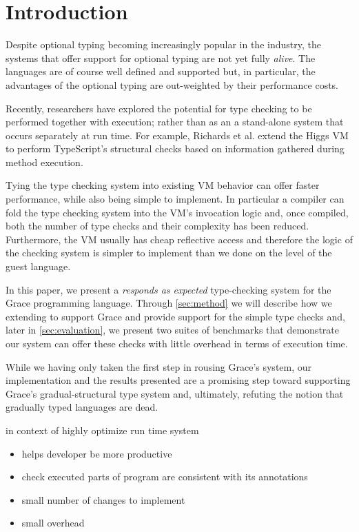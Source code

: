 
\section{Introduction}
\label{sec:introduction}

Despite optional typing becoming increasingly popular in the industry, the systems that offer support for optional typing are not yet fully \emph{alive}. The languages are of course well defined and supported but, in particular, the advantages of the optional typing are out-weighted by their performance costs. 

Recently, researchers have explored the potential for type checking to be performed together with execution; rather than as an a stand-alone system that occurs separately at run time. For example, Richards et al. extend the Higgs VM to perform TypeScript's structural checks based on information gathered during method execution. 

Tying the type checking system into existing VM behavior can offer faster performance, while also being simple to implement. In particular a compiler can fold the type checking system into the VM's invocation logic and, once compiled, both the number of type checks and their complexity has been reduced. Furthermore, the VM usually has cheap reflective access and therefore the logic of the checking system is simpler to implement than we done on the level of the guest language.

In this paper, we present a \emph{responds as expected} type-checking system for the Grace programming language. Through \cref{sec:method} we will describe how we extending \SOMns to support Grace and provide support for the simple type checks and, later in \cref{sec:evaluation}, we present two suites of benchmarks that demonstrate our system can offer these checks with little overhead in terms of execution time.

While we having only taken the first step in rousing Grace's system, our implementation and the results presented are a promising step toward supporting Grace's gradual-structural type system and, ultimately, refuting the notion that gradually typed languages are dead.



in context of highly optimize run time system

\begin{itemize}
\item helps developer be more productive
\item check executed parts of program are consistent with its annotations
\item small number of changes to implement
\item small overhead
\end{itemize}